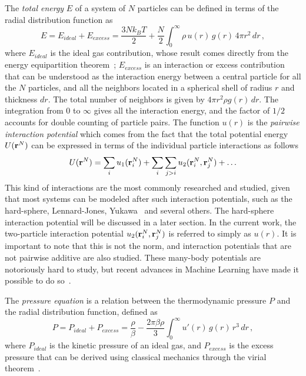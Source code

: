 The \emph{total energy} $E$ of a system of $N$ particles can be defined in terms of the
radial distribution function as
\begin{equation}
    E = E_{ideal} + E_{excess} = \frac{3 N k_{B} T}{2} +
    \frac{N}{2} \int_{0}^{\infty} \rho \, u(r) \, g(r) \, 4 \pi r^2 \, dr
    \, ,
    \label{eq:total-energy-rdf}
\end{equation}
where $E_{ideal}$ is the ideal gas contribution, whose result comes directly from
the energy equipartition theorem~\cite{mcquarrieStatisticalMechanics2000};
$E_{excess}$ is an interaction or excess contribution that can be understood
as the interaction energy between a central particle for all the $N$ particles,
and all the neighbors located in a spherical shell of radius $r$ and thickness
$dr$. The total number of neighbors is given by $4 \pi r^2 \rho g(r) \, dr$.
The integration from $0$ to $\infty$ gives all the interaction energy, and
the factor of $1/2$ accounts for double counting of particle pairs.
The function $u(r)$ is the \emph{pairwise interaction potential} which comes
from the fact that the total potential energy $U(\mathbf{r}^{N})$ can be expressed
in terms of the individual particle interactions as follows
\begin{equation}
    U(\vecr^{N}) = \sum_{i} u_{1} (\vecr_{i}^{N}) +
    \sum_{i} \sum_{j>i} u_{2} (\vecr_{i}^{N}, \vecr_{j}^{N}) +
    \dots
    \label{eq:pairwise-energy}
\end{equation}
This kind of interactions are the most commonly researched and studied, given that most
systems can be modeled after such interaction potentials, such as the
hard-sphere, Lennard-Jones, Yukawa~\cite{huangStatisticalMechanics1987}
and several others. The hard-sphere interaction potential will be discussed
in a later section.
In the current work, the two-particle interaction potential
$u_{2} (\mathbf{r}_{i}^{N}, \mathbf{r}_{j}^{N})$ is referred to simply as $u(r)$.
It is important to note that this is not the norm, and interaction potentials
that are not pairwise additive are also studied. These many-body potentials are
notoriously hard to study, but recent advances in Machine Learning have made it
possible to do so~\cite{boattiniModelingManybodyInteractions2020}.

The \emph{pressure equation} is a relation between the thermodynamic pressure
$P$ and the radial distribution function, defined as
\begin{equation}
    P=P_{ideal}+P_{excess}= \frac{\rho}{\beta} - \frac{2 \pi \beta \rho}{3}
    \int_{0}^{\infty} u'(r) \, g(r) \, r^3 \, dr \, ,
    \label{eq:pressure-equation}
\end{equation}
where $P_{ideal}$ is the kinetic pressure of an ideal gas, and $P_{excess}$
is the excess pressure that can be derived using classical mechanics through the
virial theorem~\cite{goldsteinClassicalMechanics2002}.

